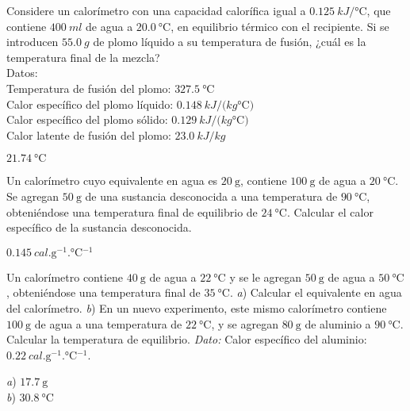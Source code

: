 %
\begin{Exercise}
  Considere un calorímetro con una capacidad calorífica igual a $\SI{0.125}{kJ/\celsius}$, que contiene $\SI{400}{ml}$ de agua a $\SI{20.0}{\celsius}$, en equilibrio térmico con el recipiente. Si se introducen $\SI{55.0}{g}$ de plomo líquido a su temperatura de fusión, ¿cuál es la temperatura final de la mezcla?\\
  Datos:\\
  Temperatura de fusión del plomo: $\SI{327.5}{\celsius}$\\
  Calor específico del plomo líquido: $\SI{0.148}{kJ/(kg \celsius)}$\\
  Calor específico del plomo sólido: $\SI{0.129}{kJ/(kg \celsius)}$\\
  Calor latente de fusión del plomo: $\SI{23.0}{kJ/kg}$
\end{Exercise}
\begin{Answer}
	\begin{minipage}[t]{.4\textwidth}
    $\SI{21.74}{\celsius}$
  \end{minipage}
\end{Answer}
%
\begin{Exercise}
  Un calorímetro cuyo equivalente en agua es $\SI{20}{\gram}$, contiene $\SI{100}{\gram}$ de agua a $\SI{20}{\celsius}$. Se agregan $\SI{50}{\gram}$ de una sustancia desconocida a una temperatura de $\SI{90}{\celsius}$, obteniéndose una temperatura final de equilibrio de $\SI{24}{\celsius}$. Calcular el calor específico de la sustancia desconocida.
\end{Exercise}
\begin{Answer}
  $\SI{0.145}{cal.\gram^{-1}.\celsius^{-1}}$
\end{Answer}
%
\begin{Exercise}
  {}{}
  Un calorímetro contiene $\SI{40}{\gram}$ de agua a $\SI{22}{\celsius}$ y se le agregan $\SI{50}{\gram}$ de agua a $\SI{50}{\celsius}$, obteniéndose una temperatura final de $\SI{35}{\celsius}$. \textit{a}) Calcular el equivalente en agua del calorímetro. \textit{b}) En un nuevo experimento, este mismo calorímetro contiene $\SI{100}{\gram}$ de agua a una temperatura de $\SI{22}{\celsius}$, y se agregan $\SI{80}{\gram}$ de aluminio a $\SI{90}{\celsius}$. Calcular la temperatura de equilibrio. \textit{Dato:} Calor específico del aluminio: $\SI{0.22}{cal.\gram^{-1}.\celsius^{-1}}$.
\end{Exercise}
\begin{Answer}
	\begin{minipage}[t]{.4\textwidth}
    \textit{a}) $\SI{17.7}{\gram}$\\ \textit{b}) $\SI{30.8}{\celsius}$
  \end{minipage}
\end{Answer}
%
